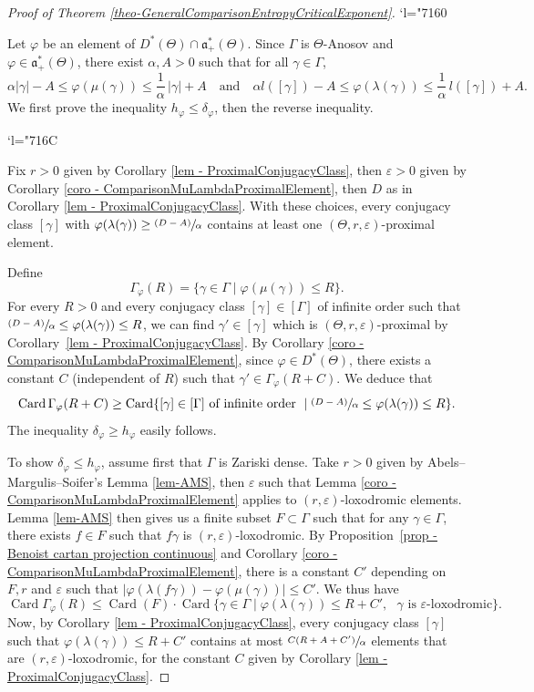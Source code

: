 \documentclass[JEP,XML,SOM,Unicode,NoEqCountersInSection,NoFloatCountersInSection,published]{cedram}
\newcommand{\quand}{\quad\text{and}\quad}
\newcommand{\psfrac}[2]{\sfrac{(#1)}{#2}}
\newcommand{\Changel}{\mathcode`l="7160}
\newcommand{\Changelback}{\mathcode`l="716C}
\theoremstyle{definition}
\newcommand{\fa}{\mathfrak{a}}
\DeclareMathOperator{\Card}{Card}
\let\epsilon\varepsilon
\let\phi\varphi
\let\G\Gamma
\let\g\gamma
\begin{document}
\begin{proof}[Proof of Theorem \ref{theo-GeneralComparisonEntropyCriticalExponent}]

\Changel

Let $\varphi$ be an element of $D^*(\Theta)\cap \fa_+^*(\Theta)$. Since $\Gamma$ is $\Theta$-Anosov and $\phi \in \fa_+^*(\Theta)$, there exist $\alpha, A>0$ such that for all $\g \in \G$,
\[\alpha \vert \g \vert - A \leq \phi(\mu(\g)) \leq \frac{1}{\alpha}\,\vert \g \vert + A\quand
\alpha l([\g]) - A \leq \phi(\lambda(\g)) \leq \frac{1}{\alpha}\,l([\g]) + A.\]
We first prove the inequality $h_\varphi \leq \delta_\varphi$, then the reverse inequality.

\Changelback

Fix $r>0$ given by Corollary \ref{lem - ProximalConjugacyClass}, then $\epsilon>0$ given by Corollary \ref{coro - ComparisonMuLambdaProximalElement}, then $D$ as in Corollary \ref{lem - ProximalConjugacyClass}. With these choices, every conjugacy class $[\gamma]$ with $\phi(\lambda(\g)) \geq \psfrac{D-A}{\alpha}$ contains at least one $(\Theta,r,\epsilon)$-proximal element.

Define
\[\Gamma_\phi(R) =\{\g \in \G \mid \phi(\mu(\gamma)) \leq R\}.\]
For every $R>0$ and every conjugacy class $[\g] \in [\G]$ of infinite order such that $\psfrac{D-A}{\alpha}\leq \varphi(\lambda(\g)) \leq R$, we can find $\g' \in [\g]$ which is $(\Theta,r,\epsilon)$-proximal by Corollary~\ref{lem - ProximalConjugacyClass}. By Corollary \ref{coro - ComparisonMuLambdaProximalElement}, since $\varphi \in D^*(\Theta)$, there exists a constant $C$ (independent of $R$) such that $\gamma' \in \Gamma_\phi(R+C)$. We deduce that
\[\Card \Gamma_\phi(R+C) \geq \Card \{[\g] \in [\Gamma] \textrm{ of infinite order } \mid \psfrac{D-A}{\alpha}\leq \varphi(\lambda(\g))\leq R\}.\]
The inequality $\delta_\varphi \geq h_\varphi$ easily follows.

To show $\delta_\varphi \leq h_\varphi$, assume first that $\G$ is Zariski dense. Take $r>0$ given by Abels--Margulis--Soifer's Lemma \ref{lem-AMS}, then $\epsilon$ such that Lemma \ref{coro - ComparisonMuLambdaProximalElement} applies to $(r,\epsilon)$\nobreakdash-loxo\-dromic elements. Lemma \ref{lem-AMS} then gives us a finite subset $F\subset \G $ such that for any $\g\in \G$, there exists $f\in F$ such that $f\g$ is $(r,\epsilon)$-loxodromic. By Proposition~\ref{prop - Benoist cartan projection continuous} and Corollary \ref{coro - ComparisonMuLambdaProximalElement}, there is a constant $C'$ depending on $F, r$ and $\epsilon$ such that \hbox{$|\varphi(\lambda(f\g)) - \varphi(\mu(\g))|\leq C'$}. We thus have
\[
\Card\Gamma_\phi(R) \leq \Card(F) \cdot \Card\{ \g \in \Gamma \mid \phi(\lambda(\g)) \leq R+C', \textrm{ $\g$ is $\epsilon$-loxodromic}\}.\]
Now, by Corollary \ref{lem - ProximalConjugacyClass}, every conjugacy class $[\g]$ such that $\phi(\lambda(\gamma)) \leq R+C'$ contains at most $\sfrac{C(R+A+C')}{\alpha}$ elements that are $(r,\epsilon)$-loxodromic, for the constant $C$ given by Corollary \ref{lem - ProximalConjugacyClass}.


\end{proof}
\end{document}
